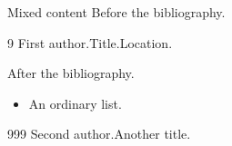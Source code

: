 \documentclass{beamer}
\begin{document}
\begin{frame}{Mixed content}
Before the bibliography.
\begin{thebibliography}{9}
 First author.\newblock Title.\newblock Location.
\end{thebibliography}
After the bibliography.
\begin{itemize}\item An ordinary list.\end{itemize}
\begin{thebibliography}{999}
 Second author.\newblock Another title.
\end{thebibliography}
\end{frame}
\end{document}
